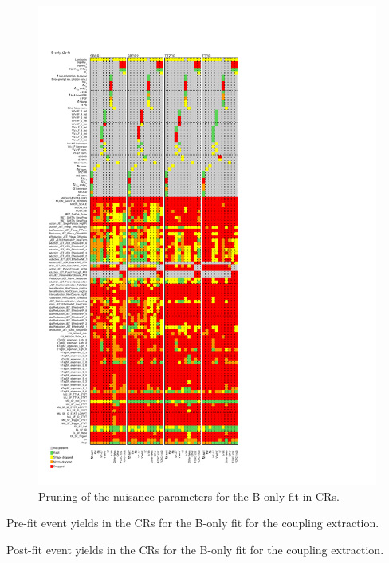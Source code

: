 \begin{figure}[htbp]
	\centering
	\includegraphics[width=.65\textwidth]{Chapters/CH7/figures/BONLY_CR_UsingDL1rcFullSys/Pruning}
	\caption{Pruning of the nuisance parameters for the B-only \tZc fit in CRs.}%
	\label{fig:stat:tzc:bonly:cr:pruning}
\end{figure}

\FloatBarrier

\begin{table}[]
	\footnotesize
	\centering
	
	\caption{Pre-fit event yields in the CRs for the B-only fit for the \tZc coupling extraction. \TabErrStatSys} 
	\label{tab:stat:tzc:bonly:cr:yields:prefit}
\end{table} 
\begin{table}[]
	\footnotesize
	\centering
	
	\caption{Post-fit event yields in the CRs for the B-only fit for the \tZc coupling extraction. \TabErrStatSys} 
	\label{tab:stat:tzc:bonly:cr:yields:postfit}
\end{table} 

\FloatBarrier

